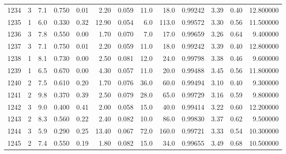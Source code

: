 \begin{tabular}{lrrrrrrrrrrrr}
1234 &        3 &            7.1 &             0.750 &         0.01 &            2.20 &      0.059 &                 11.0 &                  18.0 &  0.99242 &  3.39 &       0.40 &  12.800000 \\
1235 &        1 &            6.0 &             0.330 &         0.32 &           12.90 &      0.054 &                  6.0 &                 113.0 &  0.99572 &  3.30 &       0.56 &  11.500000 \\
1236 &        3 &            7.8 &             0.550 &         0.00 &            1.70 &      0.070 &                  7.0 &                  17.0 &  0.99659 &  3.26 &       0.64 &   9.400000 \\
1237 &        3 &            7.1 &             0.750 &         0.01 &            2.20 &      0.059 &                 11.0 &                  18.0 &  0.99242 &  3.39 &       0.40 &  12.800000 \\
1238 &        1 &            8.1 &             0.730 &         0.00 &            2.50 &      0.081 &                 12.0 &                  24.0 &  0.99798 &  3.38 &       0.46 &   9.600000 \\
1239 &        1 &            6.5 &             0.670 &         0.00 &            4.30 &      0.057 &                 11.0 &                  20.0 &  0.99488 &  3.45 &       0.56 &  11.800000 \\
1240 &        2 &            7.5 &             0.610 &         0.20 &            1.70 &      0.076 &                 36.0 &                  60.0 &  0.99494 &  3.10 &       0.40 &   9.300000 \\
1241 &        2 &            9.8 &             0.370 &         0.39 &            2.50 &      0.079 &                 28.0 &                  65.0 &  0.99729 &  3.16 &       0.59 &   9.800000 \\
1242 &        3 &            9.0 &             0.400 &         0.41 &            2.00 &      0.058 &                 15.0 &                  40.0 &  0.99414 &  3.22 &       0.60 &  12.200000 \\
1243 &        2 &            8.3 &             0.560 &         0.22 &            2.40 &      0.082 &                 10.0 &                  86.0 &  0.99830 &  3.37 &       0.62 &   9.500000 \\
1244 &        3 &            5.9 &             0.290 &         0.25 &           13.40 &      0.067 &                 72.0 &                 160.0 &  0.99721 &  3.33 &       0.54 &  10.300000 \\
1245 &        2 &            7.4 &             0.550 &         0.19 &            1.80 &      0.082 &                 15.0 &                  34.0 &  0.99655 &  3.49 &       0.68 &  10.500000 \\

\end{tabular}
